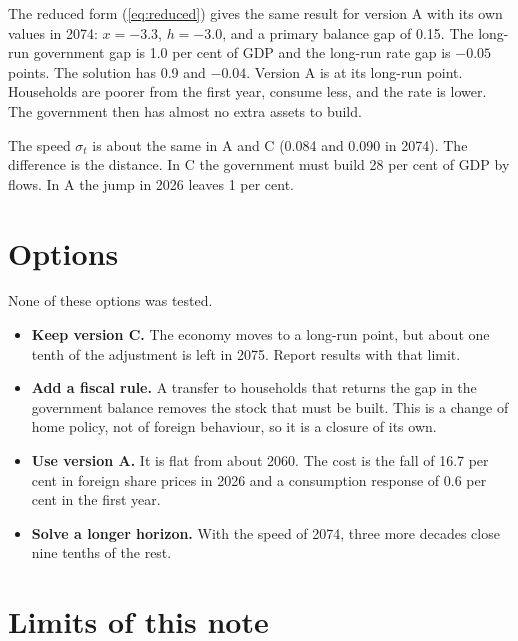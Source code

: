 \documentclass[11pt,a4paper]{article}
\begin{document}
The reduced form (\ref{eq:reduced}) gives the same result for version A with its own values in 2074:
$x = -3.3$, $h = -3.0$, and a primary balance gap of 0.15.
The long-run government gap is 1.0 per cent of GDP and the long-run rate gap is $-0.05$ points.
The solution has 0.9 and $-0.04$. Version A is at its long-run point.
Households are poorer from the first year, consume less, and the rate is lower. The government then has almost no extra assets to build.

The speed $\sigma_t$ is about the same in A and C (0.084 and 0.090 in 2074). The difference is the distance.
In C the government must build 28 per cent of GDP by flows. In A the jump in 2026 leaves 1 per cent.

\section{Options}

None of these options was tested.
\begin{itemize}
\item \textbf{Keep version C.} The economy moves to a long-run point, but about one tenth of the adjustment is left in 2075. Report results with that limit.
\item \textbf{Add a fiscal rule.} A transfer to households that returns the gap in the government balance removes the stock that must be built. This is a change of home policy, not of foreign behaviour, so it is a closure of its own.
\item \textbf{Use version A.} It is flat from about 2060. The cost is the fall of 16.7 per cent in foreign share prices in 2026 and a consumption response of 0.6 per cent in the first year.
\item \textbf{Solve a longer horizon.} With the speed of 2074, three more decades close nine tenths of the rest.
\end{itemize}

\section{Limits of this note}
\end{document}
